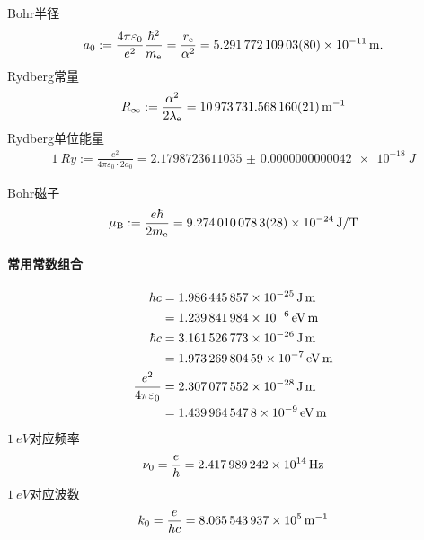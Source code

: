 Bohr半径
\begin{align}
	a_0:=\frac{4\pi\varepsilon_0}{e^2}\frac{\hbar^2}{m_\elc}=\frac{r_\elc}{\alpha^2}=\SI{5.29177210903(80)E-11}{m}.
\end{align}
Rydberg常量
\begin{align}
	R_\infty:=\frac{\alpha^2}{2\lambda_\elc}=\SI{10973731.568160(21)}{m^{-1}}
\end{align}
Rydberg单位能量
\begin{align}
	\SI{1}{Ry}:=\frac{e^2}{4\pi\varepsilon_0\cdot 2a_0}=\SI{2.1798723611035(42)e-18}{J}
\end{align}

Bohr磁子
\begin{align}
	\muB:=\frac{e\hbar}{2m_\elc}=\SI{9.2740100783(28)E-24}{J/T}
\end{align}
\paragraph{常用常数组合}
\begin{align}
	hc&=\SI{1.986445857E-25}{J.m}\\ %
	&=\SI{1.239841984E-6}{eV.m}\\  %
	\hbar c&=\SI{3.161526773E-26}{J.m}\\ %
	&=\SI{1.97326980459E-7}{eV.m}\\ %
	\frac{e^2}{4\pi\varepsilon_0}&=\SI{2.307077552E-28}{J.m}\\ %
	&=\SI{1.4399645478E-9}{eV.m} %
\end{align}
$\SI{1}{eV}$对应频率
\begin{equation}
	\nu_0=\frac eh=\SI{2.417989242E14}{Hz}
\end{equation} %
$\SI{1}{eV}$对应波数
\begin{equation}
	k_0=\frac e{hc}=\SI{8.065543937E5}{m^{-1}}
\end{equation} %
\printindex
